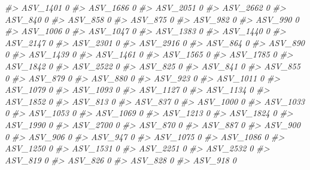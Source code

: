 \documentclass[
]{article}
\newenvironment{Shaded}{\begin{snugshade}}{\end{snugshade}}
\newcommand{\CommentTok}[1]{\textcolor[rgb]{0.56,0.35,0.01}{\textit{#1}}}
\begin{document}
\begin{Shaded}
\begin{Highlighting}[]
\CommentTok{\#\textgreater{} ASV\_1401  0}
\CommentTok{\#\textgreater{} ASV\_1686  0}
\CommentTok{\#\textgreater{} ASV\_2051  0}
\CommentTok{\#\textgreater{} ASV\_2662  0}
\CommentTok{\#\textgreater{} ASV\_840   0}
\CommentTok{\#\textgreater{} ASV\_858   0}
\CommentTok{\#\textgreater{} ASV\_875   0}
\CommentTok{\#\textgreater{} ASV\_982   0}
\CommentTok{\#\textgreater{} ASV\_990   0}
\CommentTok{\#\textgreater{} ASV\_1006  0}
\CommentTok{\#\textgreater{} ASV\_1047  0}
\CommentTok{\#\textgreater{} ASV\_1383  0}
\CommentTok{\#\textgreater{} ASV\_1440  0}
\CommentTok{\#\textgreater{} ASV\_2147  0}
\CommentTok{\#\textgreater{} ASV\_2301  0}
\CommentTok{\#\textgreater{} ASV\_2916  0}
\CommentTok{\#\textgreater{} ASV\_864   0}
\CommentTok{\#\textgreater{} ASV\_890   0}
\CommentTok{\#\textgreater{} ASV\_1439  0}
\CommentTok{\#\textgreater{} ASV\_1461  0}
\CommentTok{\#\textgreater{} ASV\_1565  0}
\CommentTok{\#\textgreater{} ASV\_1785  0}
\CommentTok{\#\textgreater{} ASV\_1842  0}
\CommentTok{\#\textgreater{} ASV\_2522  0}
\CommentTok{\#\textgreater{} ASV\_825   0}
\CommentTok{\#\textgreater{} ASV\_841   0}
\CommentTok{\#\textgreater{} ASV\_855   0}
\CommentTok{\#\textgreater{} ASV\_879   0}
\CommentTok{\#\textgreater{} ASV\_880   0}
\CommentTok{\#\textgreater{} ASV\_923   0}
\CommentTok{\#\textgreater{} ASV\_1011  0}
\CommentTok{\#\textgreater{} ASV\_1079  0}
\CommentTok{\#\textgreater{} ASV\_1093  0}
\CommentTok{\#\textgreater{} ASV\_1127  0}
\CommentTok{\#\textgreater{} ASV\_1134  0}
\CommentTok{\#\textgreater{} ASV\_1852  0}
\CommentTok{\#\textgreater{} ASV\_813   0}
\CommentTok{\#\textgreater{} ASV\_837   0}
\CommentTok{\#\textgreater{} ASV\_1000  0}
\CommentTok{\#\textgreater{} ASV\_1033  0}
\CommentTok{\#\textgreater{} ASV\_1053  0}
\CommentTok{\#\textgreater{} ASV\_1069  0}
\CommentTok{\#\textgreater{} ASV\_1213  0}
\CommentTok{\#\textgreater{} ASV\_1824  0}
\CommentTok{\#\textgreater{} ASV\_1990  0}
\CommentTok{\#\textgreater{} ASV\_2700  0}
\CommentTok{\#\textgreater{} ASV\_870   0}
\CommentTok{\#\textgreater{} ASV\_887   0}
\CommentTok{\#\textgreater{} ASV\_900   0}
\CommentTok{\#\textgreater{} ASV\_906   0}
\CommentTok{\#\textgreater{} ASV\_947   0}
\CommentTok{\#\textgreater{} ASV\_1075  0}
\CommentTok{\#\textgreater{} ASV\_1086  0}
\CommentTok{\#\textgreater{} ASV\_1250  0}
\CommentTok{\#\textgreater{} ASV\_1531  0}
\CommentTok{\#\textgreater{} ASV\_2251  0}
\CommentTok{\#\textgreater{} ASV\_2532  0}
\CommentTok{\#\textgreater{} ASV\_819   0}
\CommentTok{\#\textgreater{} ASV\_826   0}
\CommentTok{\#\textgreater{} ASV\_828   0}
\CommentTok{\#\textgreater{} ASV\_918   0}

\end{Highlighting}
\end{Shaded}
\end{document}
